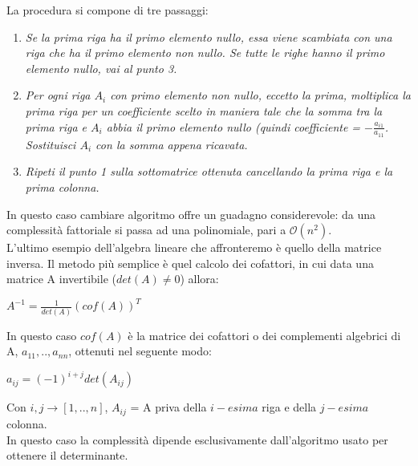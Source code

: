 \newpage
\noindent La procedura si compone di tre passaggi:
\begin{enumerate}
\item{\textit{Se la prima riga ha il primo elemento nullo, essa viene scambiata con una riga che ha il primo elemento non nullo. Se tutte le righe hanno il primo elemento nullo, vai al punto 3.\\}}
\item{\textit{Per ogni riga $A_{i}$ con primo elemento non nullo, eccetto la prima, moltiplica la prima riga per un coefficiente scelto in maniera tale che la somma tra la prima riga e $A_{i}$ abbia il primo elemento nullo (quindi coefficiente = $-\frac{a_{i1}}{a_{11}}$. Sostituisci $A_{i}$ con la somma appena ricavata.\\}}
\item{\textit{Ripeti il punto 1 sulla sottomatrice ottenuta cancellando la prima riga e la prima colonna.}}
\\
\end{enumerate}
In questo caso cambiare algoritmo offre un guadagno considerevole: da una complessità fattoriale si passa ad una polinomiale, pari a $\mathcal{O}(n^2)$.\\
L'ultimo esempio dell'algebra lineare che affronteremo è quello della matrice inversa. Il metodo più semplice è quel calcolo dei cofattori, in cui data una matrice A invertibile ($det(A) \neq 0$) allora:
\begin{center}
{$A^{-1} = \frac{1}{det(A)}(cof(A))^T$\\}
\end{center}
In questo caso $cof(A)$ è la matrice dei cofattori o dei complementi algebrici di A, $a_{11},.., a_{nn}$, ottenuti nel seguente modo:
\begin{center}
{$a_{ij} = (-1)^{i+j} det(A_{ij})$ \\}
\end{center}
Con $i,j\rightarrow[1,..,n]$, $A_{ij}$ = A priva della $i-esima$ riga e della $j-esima$ colonna.\\
In questo caso la complessità dipende esclusivamente dall'algoritmo usato per ottenere il determinante.
